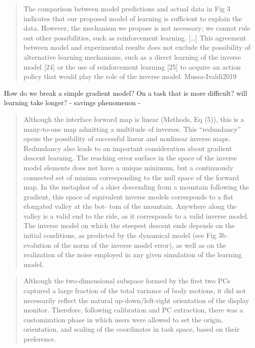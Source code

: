 \documentclass[../main.tex]{subfiles}
\begin{document}
{{{{{{{{{{{\begin{quote}
The comparison between model predictions and actual data in Fig 3
indicates that our proposed model of learning is sufficient to explain
the data. However, the mechanism we propose is not necessary; we cannot
rule out other possibilities, such as reinforcement learning.
{[}\ldots{]} This agreement between model and experimental results does
not exclude the possibility of alternative learning mechanisms, such as
a direct learning of the inverse model {[}24{]} or the use of
reinforcement learning {[}25{]} to acquire an action policy that would
play the role of the inverse model. Mussa-Ivaldi2019
\end{quote}

How do we break a simple gradient model? On a task that is more
difficult? will learning take longer? - savings phenomenon -

\begin{quote}
Although the interface forward map is linear (Methods, Eq (5)), this is
a many-to-one map admitting a multitude of inverses. This ``redundancy''
opens the possibility of successful linear and nonlinear inverse maps.
Redundancy also leads to an important consideration about gradient
descent learning. The reaching error surface in the space of the inverse
model elements does not have a unique minimum, but a continuously
connected set of minima corresponding to the null space of the forward
map. In the metaphor of a skier descending from a mountain following the
gradient, this space of equivalent inverse models corresponds to a flat
elongated valley at the bot- tom of the mountain. Anywhere along the
valley is a valid end to the ride, as it corresponds to a valid inverse
model. The inverse model on which the steepest descent ends depends on
the initial conditions, as predicted by the dynamical model (see Fig
3b--evolution of the norm of the inverse model error), as well as on the
realization of the noise employed in any given simulation of the
learning model.
\end{quote}

\begin{quote}
Although the two-dimensional subspace formed by the first two PCs
captured a large fraction of the total variance of body motions, it did
not necessarily reflect the natural up-down/left-right orientation of
the display monitor. Therefore, following calibration and PC extraction,
there was a customization phase in which users were allowed to set the
origin, orientation, and scaling of the coordinates in task space, based
on their preference.
\end{quote}

}}}}}}}}}}}
\end{document}
